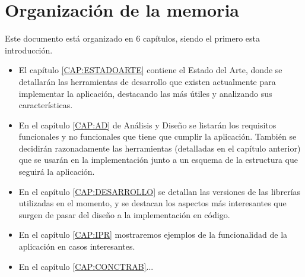   \section{Organización de la memoria\label{SEC:ORGANIZACION}}
    Este documento está organizado en 6 capítulos, siendo el primero esta introducción. 
    \begin{itemize}
      \item El capítulo \ref{CAP:ESTADOARTE} contiene el Estado del Arte, donde se detallarán las herramientas de desarrollo que existen actualmente para implementar la aplicación, destacando las más útiles y analizando sus características.
      \item En el capítulo \ref{CAP:AD} de Análisis y Diseño se listarán los requisitos funcionales y no funcionales que tiene que cumplir la aplicación. También se decidirán razonadamente las herramientas (detalladas en el capítulo anterior) que se usarán en la implementación junto a un esquema de la estructura que seguirá la aplicación.
      \item En el capítulo \ref{CAP:DESARROLLO} se detallan las versiones de las librerías utilizadas en el momento, y se destacan los aspectos más interesantes que surgen de pasar del diseño a la implementación en código.
      \item En el capítulo \ref{CAP:IPR} mostraremos ejemplos de la funcionalidad de la aplicación en casos interesantes.
      \item En el capítulo \ref{CAP:CONCTRAB}...
    \end{itemize}
    
    
